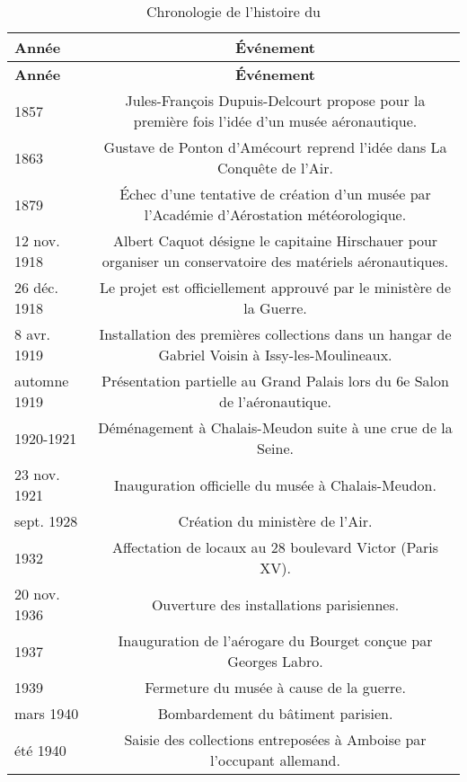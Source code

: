 \begin{longtable}{B C}
	\caption{Chronologie de l'histoire du \maelong}
	\label{tab:chronologiemae}\\
	\hline\hline
	\textbf{Année} & \textbf{Événement} \\
	\hline
	\endfirsthead
	
	\hline\hline
	\textbf{Année} & \textbf{Événement} \\
	\hline
	\endhead
	
	\hline
	\endfoot
	
	\hline\hline
	\endlastfoot
	
	
	1857 & Jules-François Dupuis-Delcourt propose pour la première fois l'idée d'un musée aéronautique. \\
	1863 & Gustave de Ponton d'Amécourt reprend l'idée dans La Conquête de l'Air. \\
	1879 & Échec d'une tentative de création d'un musée par l'Académie d'Aérostation météorologique. \\
	
	12 nov. 1918 & Albert Caquot désigne le capitaine Hirschauer pour organiser un conservatoire des matériels aéronautiques.\\
	 26 déc. 1918 & Le projet est officiellement approuvé par le ministère de la Guerre. \\
	 8 avr. 1919 & Installation des premières collections dans un hangar de Gabriel Voisin à Issy-les-Moulineaux. \\
	 automne 1919 & Présentation partielle au Grand Palais lors du 6e Salon de l'aéronautique. \\
	 1920-1921 & Déménagement à Chalais-Meudon suite à une crue de la Seine. \\
	 23 nov. 1921 & Inauguration officielle du musée à Chalais-Meudon. \\
	
	sept. 1928 & Création du ministère de l'Air. \\
	1932 & Affectation de locaux au 28 boulevard Victor (Paris XV). \\
	20 nov. 1936 & Ouverture des installations parisiennes. \\
	1937 & Inauguration de l'aérogare du Bourget conçue par Georges Labro. \\
	1939 & Fermeture du musée à cause de la guerre. \\
	mars 1940 & Bombardement du bâtiment parisien. \\
	été 1940 & Saisie des collections entreposées à Amboise par l'occupant allemand. \\
	

\end{longtable}
